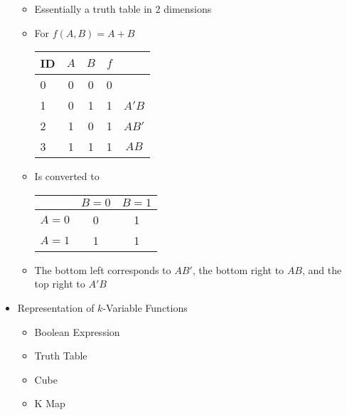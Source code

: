 \begin{itemize}
\begin{itemize}
      \item Essentially a truth table in 2 dimensions

      \item For $f(A,B)=A+B$

        \begin{center}
          \begin{tabular}[h!]{| l | c | c | c | c |}
            \hline
            ID & $A$ & $B$ & $f$ & \\
            \hline
            0 & 0 & 0 & 0 & \\
            \hline
            1 & 0 & 1 & 1 & $A'B$\\
            \hline
            2 & 1 & 0 & 1 & $AB'$\\
            \hline
            3 & 1 & 1 & 1 & $AB$\\
            \hline
          \end{tabular}
        \end{center}

      \item Is converted to

      \begin{center}
        \begin{tabular}[h!]{c | c | c}
          & $B=0$ & $B=1$\\
          \hline
          $A=0$ & 0 & 1 \\
          \hline
          $A=1$ & 1 & 1 \\
          \hline
        \end{tabular}
      \end{center}

    \item The bottom left corresponds to $AB'$, the bottom right to $AB$, and the top right to $A'B$

    \end{itemize}

  \item Representation of $k$-Variable Functions

    \begin{itemize}

      \item Boolean Expression

      \item Truth Table

      \item Cube

      \item K Map


\end{itemize}
\end{itemize}
